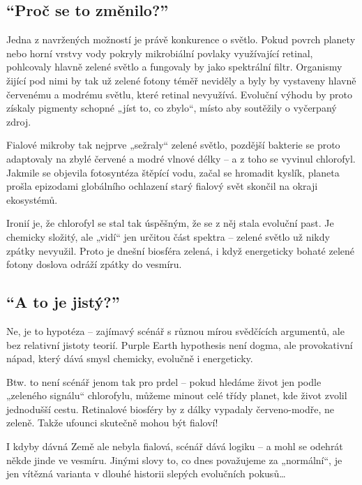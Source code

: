 \documentclass[main.tex]{subfiles}
\begin{document}
\subsection*{\enquote{Proč se to změnilo?}}
Jedna z navržených možností je právě konkurence o světlo. Pokud povrch planety nebo horní vrstvy vody pokryly mikrobiální povlaky využívající retinal, pohlcovaly hlavně zelené světlo a fungovaly by jako spektrální filtr. Organismy žijící pod nimi by tak už zelené fotony téměř neviděly a byly by vystaveny hlavně červenému a modrému světlu, které retinal nevyužívá. Evoluční výhodu by proto získaly pigmenty schopné „jíst to, co zbylo“, místo aby soutěžily o vyčerpaný zdroj.\par
Fialové mikroby tak nejprve „sežraly“ zelené světlo, pozdější bakterie se proto adaptovaly na zbylé červené a modré vlnové délky – a z toho se vyvinul chlorofyl. Jakmile se objevila fotosyntéza štěpící vodu, začal se hromadit kyslík, planeta prošla epizodami globálního ochlazení starý fialový svět skončil na okraji ekosystémů.\par
Ironií je, že chlorofyl se stal tak úspěšným, že se z něj stala evoluční past. Je chemicky složitý, ale „vidí“ jen určitou část spektra – zelené světlo už nikdy zpátky nevyužil. Proto je dnešní biosféra zelená, i když energeticky bohaté zelené fotony doslova odráží zpátky do vesmíru.
\subsection*{\enquote{A to je jistý?}}
Ne, je to  hypotéza – zajímavý scénář s různou mírou svědčících argumentů, ale bez relativní jistoty teorií. Purple Earth hypothesis není dogma, ale provokativní nápad, který dává smysl chemicky, evolučně i energeticky.\par
Btw. to není scénář jenom tak pro prdel – pokud hledáme život jen podle „zeleného signálu“ chlorofylu, můžeme minout celé třídy planet, kde život zvolil jednodušší cestu. Retinalové biosféry by z dálky vypadaly červeno-modře, ne zeleně. Takže ufounci skutečně mohou být fialoví!\par
I kdyby dávná Země ale nebyla fialová, scénář dává logiku – a mohl se odehrát někde jinde ve vesmíru. Jinými slovy to, co dnes považujeme za „normální“, je jen vítězná varianta v dlouhé historii slepých evolučních pokusů…
\newpage
\end{document}
